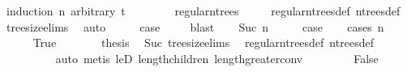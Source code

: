 \begin{isabellebody}
\isamarkupfalse%
\ {\isacharparenleft}{\kern0pt}induction\ n\ arbitrary{\isacharcolon}{\kern0pt}\ t{\isacharparenright}{\kern0pt}\isanewline
\ \ \isamarkupfalse%
\ {}\isanewline
\ \ \isamarkupfalse%
\ {\isachardoublequoteopen}regular{\isacharunderscore}{\kern0pt}n{\isacharunderscore}{\kern0pt}trees\ {}\ {\isacharequal}{\kern0pt}\ {\isacharbraceleft}{\kern0pt}{\isacharbraceright}{\kern0pt}{\isachardoublequoteclose}\ \isamarkupfalse%
\ regular{\isacharunderscore}{\kern0pt}n{\isacharunderscore}{\kern0pt}trees{\isacharunderscore}{\kern0pt}def\ n{\isacharunderscore}{\kern0pt}trees{\isacharunderscore}{\kern0pt}def\ \isamarkupfalse%
\ tree{\isacharunderscore}{\kern0pt}size{\isachardot}{\kern0pt}elims\ \isamarkupfalse%
\ auto\isanewline
\ \ \isamarkupfalse%
\ \isamarkupfalse%
\ {\isacharquery}{\kern0pt}case\ \isamarkupfalse%
\ {}\ \isamarkupfalse%
\ blast\isanewline
{}\isamarkupfalse%
\isanewline
\ \ \isamarkupfalse%
\ {\isacharparenleft}{\kern0pt}Suc\ n{\isacharparenright}{\kern0pt}\isanewline
\ \ \isamarkupfalse%
\ \isamarkupfalse%
\ {\isacharquery}{\kern0pt}case\isanewline
\ \ \isamarkupfalse%
\ {\isacharparenleft}{\kern0pt}cases\ {\isachardoublequoteopen}n\ {\isacharequal}{\kern0pt}\ {}{\isachardoublequoteclose}{\isacharparenright}{\kern0pt}\isanewline
\ \ \ \ \isamarkupfalse%
\ True\isanewline
\ \ \ \ \isamarkupfalse%
\ \isamarkupfalse%
\ {\isacharquery}{\kern0pt}thesis\ \isamarkupfalse%
\ Suc\ tree{\isacharunderscore}{\kern0pt}size{\isachardot}{\kern0pt}elims\ \isamarkupfalse%
\ regular{\isacharunderscore}{\kern0pt}n{\isacharunderscore}{\kern0pt}trees{\isacharunderscore}{\kern0pt}def\ n{\isacharunderscore}{\kern0pt}trees{\isacharunderscore}{\kern0pt}def\isanewline
\ \ \ \ \ \ \ \ \isamarkupfalse%
\ {\isacharparenleft}{\kern0pt}auto{\isacharcomma}{\kern0pt}\ metis\ leD\ length{\isacharunderscore}{\kern0pt}children\ length{\isacharunderscore}{\kern0pt}greater{\isacharunderscore}{\kern0pt}{}{\isacharunderscore}{\kern0pt}conv{\isacharparenright}{\kern0pt}\isanewline
\ \ \isamarkupfalse%
\isanewline
\ \ \ \ \isamarkupfalse%
\ False\isanewline
\ \ \ \ \isamarkupfalse%
\ \isamarkupfalse%

\end{isabellebody}
